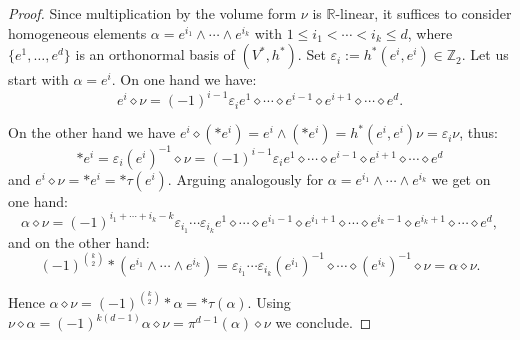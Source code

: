 \documentclass[10pt,a4paper,twoside,reqno]{amsart}
\theoremstyle{plain}
\theoremstyle{definition}
\theoremstyle{remark}
\def\Z{\mathbb{Z}}
\def\R{\mathbb{R}}
\def\R{\mathbb{R}}
\begin{document}
\begin{proof}
    Since multiplication by the volume form $\nu$ is $\R$-linear, it suffices to consider homogeneous elements $\alpha=e^{i_1}\wedge\cdots\wedge e^{i_k}$ with $1\leq i_1<\cdots<i_k\leq d$, where $\{e^1,\ldots,e^d\}$ is an orthonormal basis of $(V^*,h^*)$. Set $\varepsilon_i:=h^*(e^i,e^i)\in\Z_2$. Let us start with $\alpha=e^i$. On one hand we have: $$e^i\diamond\nu=(-1)^{i-1}\varepsilon_ie^1\diamond\cdots\diamond e^{i-1}\diamond e^{i+1}\diamond\cdots\diamond e^d.$$
    
    On the other hand we have $e^i\diamond(*e^i)=e^i\wedge(*e^i)=h^*(e^i,e^i)\nu=\varepsilon_i\nu$, thus: $$*e^i=\varepsilon_i(e^i)^{-1}\diamond\nu=(-1)^{i-1}\varepsilon_ie^1\diamond\cdots\diamond e^{i-1}\diamond e^{i+1}\diamond\cdots\diamond e^d$$ and $e^i\diamond\nu=*e^i=*\tau(e^i)$. Arguing analogously for $\alpha=e^{i_1}\wedge\cdots\wedge e^{i_k}$ we get on one hand: $$\alpha\diamond\nu=(-1)^{i_1+\cdots+i_k-k}\varepsilon_{i_1}\cdots\varepsilon_{i_k}e^1\diamond\cdots\diamond e^{i_1-1}\diamond e^{i_1+1}\diamond\cdots\diamond e^{i_k-1}\diamond e^{i_k+1}\diamond\cdots\diamond e^d,$$ and on the other hand: $$(-1)^{\binom{k}{2}}*(e^{i_1}\wedge\cdots\wedge e^{i_k})=\varepsilon_{i_1}\cdots\varepsilon_{i_k}(e^{i_1})^{-1}\diamond\cdots\diamond(e^{i_k})^{-1}\diamond\nu=\alpha\diamond\nu.$$
    
    Hence $\alpha\diamond\nu=(-1)^{\binom{k}{2}}*\alpha=*\tau(\alpha)$. Using $\nu\diamond\alpha=(-1)^{k(d-1)}\alpha\diamond\nu=\pi^{d-1}(\alpha)\diamond\nu$ we conclude.
\end{proof}




\end{document}
